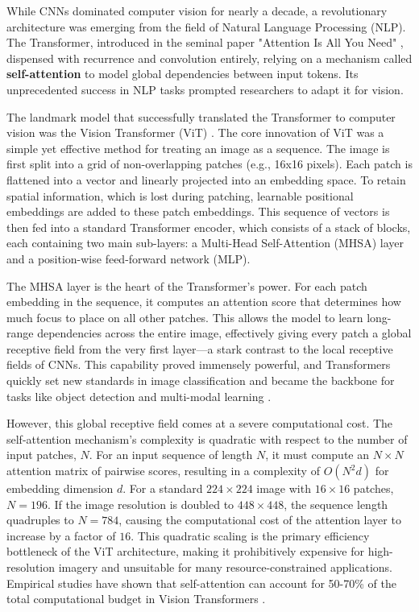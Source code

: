 \documentclass[12pt, a4paper]{article}
\begin{document}
While CNNs dominated computer vision for nearly a decade, a revolutionary architecture was emerging from the field of Natural Language Processing (NLP). The Transformer, introduced in the seminal paper "Attention Is All You Need" \cite{vaswani2017attention}, dispensed with recurrence and convolution entirely, relying on a mechanism called \textbf{self-attention} to model global dependencies between input tokens. Its unprecedented success in NLP tasks prompted researchers to adapt it for vision.

The landmark model that successfully translated the Transformer to computer vision was the Vision Transformer (ViT) \cite{dosovitskiy2020image}. The core innovation of ViT was a simple yet effective method for treating an image as a sequence. The image is first split into a grid of non-overlapping patches (e.g., 16x16 pixels). Each patch is flattened into a vector and linearly projected into an embedding space. To retain spatial information, which is lost during patching, learnable positional embeddings are added to these patch embeddings. This sequence of vectors is then fed into a standard Transformer encoder, which consists of a stack of blocks, each containing two main sub-layers: a Multi-Head Self-Attention (MHSA) layer and a position-wise feed-forward network (MLP).

The MHSA layer is the heart of the Transformer's power. For each patch embedding in the sequence, it computes an attention score that determines how much focus to place on all other patches. This allows the model to learn long-range dependencies across the entire image, effectively giving every patch a global receptive field from the very first layer---a stark contrast to the local receptive fields of CNNs. This capability proved immensely powerful, and Transformers quickly set new standards in image classification \cite{touvron2021training} and became the backbone for tasks like object detection \cite{carion2020end} and multi-modal learning \cite{radford2021learning}.

However, this global receptive field comes at a severe computational cost. The self-attention mechanism's complexity is quadratic with respect to the number of input patches, $N$. For an input sequence of length $N$, it must compute an $N \times N$ attention matrix of pairwise scores, resulting in a complexity of $O(N^2 d)$ for embedding dimension $d$. For a standard $224 \times 224$ image with $16 \times 16$ patches, $N=196$. If the image resolution is doubled to $448 \times 448$, the sequence length quadruples to $N=784$, causing the computational cost of the attention layer to increase by a factor of $16$. This quadratic scaling is the primary efficiency bottleneck of the ViT architecture, making it prohibitively expensive for high-resolution imagery and unsuitable for many resource-constrained applications. Empirical studies have shown that self-attention can account for 50-70\% of the total computational budget in Vision Transformers \cite{liu2021swin}.
\end{document}

